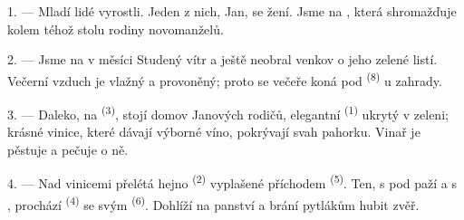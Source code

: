 %
%

\VUsaut{4.0mm}
\VUsaut{1.6mm}
\VUsaut{3.2mm}

\VUsaut{1.6mm}
\VUsaut{2.6mm}

\VUsaut{3.0mm}

1. --- Mladí lidé vyrostli. Jeden z nich, Jan, se žení. Jsme na ,
která shromažďuje kolem téhož stolu rodiny novomanželů.

2. --- Jsme na  v měsíci  Studený vítr  a
 ještě neobral venkov o jeho zelené listí. Večerní vzduch je vlažný
a provoněný; proto se večeře koná pod  \textsuperscript{(8)} u zahrady.

3. --- Daleko, na  \textsuperscript{(3)}, stojí domov Janových rodičů,
elegantní  \textsuperscript{(1)} ukrytý v zeleni; krásné vinice, které dávají
výborné víno, pokrývají svah pahorku. Vinař je pěstuje a pečuje o ně.

4. --- Nad vinicemi přelétá hejno  \textsuperscript{(2)} vyplašené příchodem
 \textsuperscript{(5)}. Ten, s  pod paží a s
, prochází 
\textsuperscript{(4)} se svým  \textsuperscript{(6)}. Dohlíží na panství a brání
pytlákům hubit zvěř.


